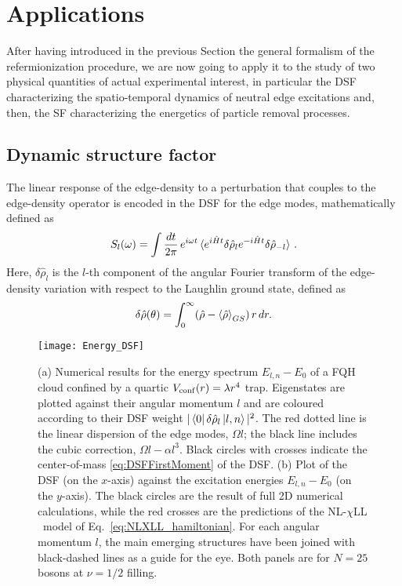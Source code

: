 \documentclass[twocolumn,pra,superscriptaddress,noshowpacs]{revtex4}
\newcommand{\nlchill}{NL-$\chi$LL }
\begin{document}
\section{Applications}
\label{sec:Applications}
After having introduced in the previous Section the general formalism of the refermionization procedure, we are now going to apply it to the study of two physical quantities of actual experimental interest, in particular the DSF characterizing the spatio-temporal dynamics of neutral edge excitations and, then, the SF characterizing the energetics of particle removal processes.

\subsection{Dynamic structure factor}
The linear response of the edge-density to a perturbation that couples to the edge-density operator is encoded in the DSF for the edge modes, mathematically defined as
\begin{equation}
    \label{eq:dynamic_structure_factor}
    S_l(\omega)=\int \frac{dt}{2\pi}\,e^{i\omega t}\braket{e^{i\hat{H}t} \delta\hat{\rho}_{l} e^{-i\hat{H}t} \delta\hat{\rho}_{-l}}\,.
\end{equation}
Here, $\delta\hat\rho_l$ is the $l$-th component of the angular Fourier transform of the edge-density variation with respect to the Laughlin ground state, defined as
\begin{equation}
    \delta\hat{\rho}(\theta) = \int_0^\infty (\hat{\rho}-\braket{\hat{\rho}}_{GS})\,r\,dr.
\end{equation}

\begin{figure}[htbp]
   	\begin{adjustbox}{width=.5\textwidth, totalheight=\baselineskip,keepaspectratio,right}
      	\texttt{[image: Energy\_DSF]}
    \end{adjustbox}
    \vspace{0.0cm}\caption{(a) Numerical results for the energy spectrum $E_{l,n}-E_0$ of a FQH cloud confined by a quartic $V_{\rm conf}(r)=\lambda r^4$ trap. Eigenstates are plotted against their angular momentum $l$ and are coloured according to their DSF weight $|\bra{0}\delta\hat{\rho}_l\ket{l,n}|^2$.
    The red dotted line is the linear dispersion of the edge modes, $\Omega l$; the black line includes the cubic correction, $\Omega l-\alpha l^3$. Black circles with crosses indicate the center-of-mass \eqref{eq:DSFFirstMoment} of the DSF.
    (b) Plot of the DSF (on the $x$-axis) against the excitation energies $E_{l,n}-E_0$ (on the $y$-axis). 
    The black circles are the result of full 2D numerical calculations, while the red crosses are the predictions of the \nlchill~model of Eq.~\eqref{eq:NLXLL_hamiltonian}. For each angular momentum $l$, the main emerging structures have been joined with black-dashed lines as a guide for the eye.
    Both panels are for $N=25$ bosons at $\nu=1/2$ filling.
    \label{fig:Energy_DSF}}
\end{figure}
\end{document}
